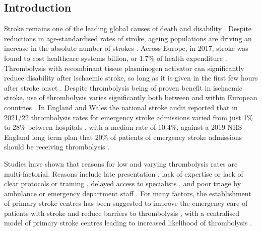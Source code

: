 \subsection{Introduction}



Stroke remains one of the leading global causes of death and disability \cite{feigin_global_2021}. Despite reductions in age-standardised rates of stroke, ageing populations are driving an increase in the absolute number of strokes \cite{feigin_global_2021}. Across Europe, in 2017, stroke was found to cost healthcare systems  billion, or 1.7\% of health expenditure \cite{luengo-fernandez_economic_2020}. Thrombolysis with recombinant tissue plasminogen activator can significantly reduce disability after ischaemic stroke, so long as it is given in the first few hours after stroke onset \cite{emberson_effect_2014}. Despite thrombolysis being of proven benefit in ischaemic stroke, use of thrombolysis varies significantly both between and within European countries \cite{aguiar_de_sousa_access_2019}. In England and Wales the national stroke audit reported that in 2021/22 thrombolysis rates for emergency stroke admissions varied from just 1\% to 28\% between hospitals \cite{sentinel_national_stroke_audit_programme_ssnap_2022}, with a median rate of 10.4\%, against a 2019 NHS England long term plan that 20\% of patients of emergency stroke admissions should be receiving thrombolysis \cite{nhs_long_term_plan_2019}.


Studies have shown that reasons for low and varying thrombolysis rates are multi-factorial. Reasons include late presentation \cite{aguiar_de_sousa_access_2019}, lack of expertise \cite{aguiar_de_sousa_access_2019} or lack of clear protocols or training \cite{carter-jones_stroke_2011}, delayed access to specialists \cite{kamal_delays_2017}, and poor triage by ambulance or emergency department staff \cite{carter-jones_stroke_2011}. For many factors, the establishment of primary stroke centres has been suggested to improve the emergency care of patients with stroke and reduce barriers to thrombolysis \cite{carter-jones_stroke_2011}, with a centralised model of primary stroke centres leading to increased likelihood of thrombolysis \cite{lahr_proportion_2012, morris_impact_2014, hunter_impact_2013}. 

